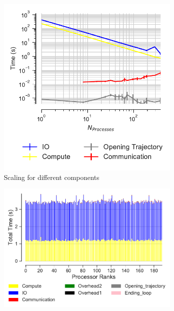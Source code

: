 \begin{figure}[ht!]
\begin{subfigure}{.4\textwidth}
\centering
  \includegraphics[width=\linewidth]{figures/hdf5-time_comp_IO_comparison.pdf}
  \captionsetup{format=hang}
\caption{Scaling for different components}
\label{fig:ScalingComputeIO-hdf5}
\end{subfigure}
\hfill
\begin{subfigure} {.5\textwidth}
  \includegraphics[width=\linewidth]{figures/hdf5-BarPlot-rank-comparison_192_4.pdf}
  \captionsetup{format=hang}

\end{subfigure}
\end{figure}
